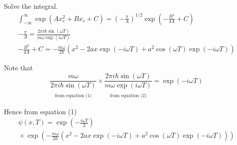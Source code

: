 \documentclass[12pt]{article}
\begin{document}
Solve the integral.
\begin{gather*}
\int_{-\infty}^\infty\exp(Ax_c^2+Bx_c+C)
=\left(-\frac{\pi}{A}\right)^{1/2}
\exp\left(-\frac{B^2}{4A}+C\right)
\\
-\frac{\pi}{A}
=\frac{2\pi i\hbar\sin(\omega T)}{m\omega\exp(i\omega T)}
\tag{2}
\\
-\frac{B^2}{4A}+C
=-\frac{m\omega}{2\hbar}
\left(x^2-2ax\exp(-i\omega T)+a^2\cos(\omega T)\exp(-i\omega T)\right)
\tag{3}
\end{gather*}

Note that
\begin{equation*}
\underset{\substack{\\[1ex]\text{from equation (1)}}}
{\frac{m\omega}{2\pi i\hbar\sin(\omega T)}}
\times
\underset{\substack{\\[1ex]\text{from equation (2)}}}
{\frac{2\pi i\hbar\sin(\omega T)}{m\omega\exp(i\omega T)}}
=\exp(-i\omega T)
\tag{4}
\end{equation*}

Hence from equation (1)
\begin{multline*}
\psi(x,T)=\exp\left(-\frac{i\omega T}{2}\right)
\\
{}\times
\exp\left(
-\frac{m\omega}{2\hbar}
\left(x^2-2ax\exp(-i\omega T)+a^2\cos(\omega T)\exp(-i\omega T)\right)
\right)
\end{multline*}
\end{document}
